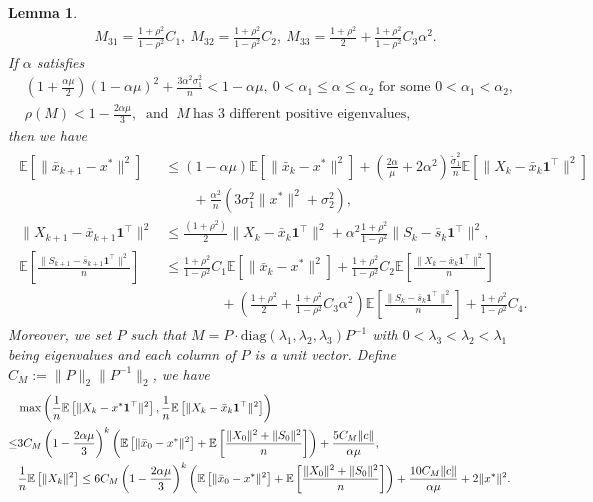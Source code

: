 \documentclass{article}
\theoremstyle{plain}
\newtheorem{lemma}[theorem]{Lemma}
\theoremstyle{definition}
\theoremstyle{remark}
\newcommand{\E}{\mathbb{E}}
\newcommand{\bfonet}{\mathbf{1}^{\top}}
\begin{document}
\begin{lemma}
\begin{align*}
        &M_{31} = \frac{1+\rho^2}{1-\rho^2}C_1,\ M_{32} = \frac{1+\rho^2}{1-\rho^2}C_2,\ M_{33} = \frac{1+\rho^2}{2} + \frac{1+\rho^2}{1-\rho^2}C_3\alpha^2.
    \end{align*}
    If $\alpha$ satisfies
    \begin{equation}\label{ineq: stepsize_for_quadratics}
        \begin{aligned}
            &\left(1+\frac{\alpha\mu}{2}\right)(1-\alpha\mu)^2 + \frac{3\alpha^2\sigma_1^2}{n}<1-\alpha\mu,\ 0< \alpha_1\leq \alpha \leq \alpha_2 \text{ for some } 0<\alpha_1<\alpha_2, \\
            &\rho(M) < 1 - \frac{2\alpha\mu}{3},\ \text{ and }~M~\text{has 3 different positive eigenvalues,}  
        \end{aligned}
    \end{equation} 
    then we have
    \begin{align}\label{ineq: dsgd_quadratic}
    \begin{aligned}
            \E\left[\|\bar{x}_{k+1} - x^*\|^2\right] &\leq (1-\alpha\mu)\E\left[\|\bar{x}_k - x^*\|^2\right] + \left(\frac{2\alpha}{\mu} + 2\alpha^2\right)\frac{\tilde{\sigma}_1^2}{n}\E\left[\|X_k - \bar{x}_k\bfonet\|^2\right]\\&\qquad + \frac{\alpha^2}{n}(3\sigma_1^2\|x^*\|^2 + \sigma_2^2), \\
        \|X_{k+1} - \bar{x}_{k+1}\bfonet\|^2 &\leq \frac{(1+\rho^2)}{2}\|X_k - \bar{x}_k\bfonet\|^2 + \alpha^2\frac{1+\rho^2}{1-\rho^2}\|S_k - \bar{s}_k\bfonet\|^2, \\
        \E\left[\frac{\|S_{k+1} - \bar{s}_{k+1}\bfonet\|^2}{n}\right] &\leq  \frac{1+\rho^2}{1-\rho^2}C_1\E\left[\|\bar{x}_k - x^*\|^2\right] + \frac{1+\rho^2}{1-\rho^2}C_2\E\left[\frac{\|X_k - \bar{x}_k\bfonet\|^2}{n}\right]  \\&\qquad \qquad + \left(\frac{1+\rho^2}{2}  + \frac{1+\rho^2}{1-\rho^2}C_3\alpha^2\right)\E\left[\frac{\|S_k-\bar{s}_k\bfonet\|^2}{n}\right] +\frac{1+\rho^2}{1-\rho^2}C_4.
        \end{aligned}
    \end{align}
    Moreover, we set $P$ such that $M = P\cdot\text{diag}(\lambda_1, \lambda_2, \lambda_3)P^{-1}$ with $0<\lambda_3<\lambda_2<\lambda_1$ being eigenvalues and each column of $P$ is a unit vector. Define $C_M:= \|P\|_2\|P^{-1}\|_2$, we have
    \begin{align}
        &\max\left(\frac{1}{n}\E\left[\|X_k - x^*\bfonet\|^2\right], \frac{1}{n}\E\left[\|X_k-\bar{x}_k\bfonet\|^2\right]\right) \notag \\
        \leq &3C_M\left(1-\frac{2\alpha\mu}{3}\right)^k\left(\E\left[\|\bar{x}_0 - x^*\|^2\right] + \E\left[\frac{\|X_0\|^2 + \|S_0\|^2}{n}\right]\right) + \frac{5C_M\|c\|}{\alpha\mu},   \label{ineq: quadratic_conv} \\
        &\frac{1}{n}\E\left[\|X_k\|^2\right]\leq 6C_M\left(1-\frac{2\alpha\mu}{3}\right)^k\left(\E\left[\|\bar{x}_0 - x^*\|^2\right] + \E\left[\frac{\|X_0\|^2 + \|S_0\|^2}{n}\right]\right) + \frac{10C_M\|c\|}{\alpha\mu} + 2\|x^*\|^2. \label{ineq: bdd_2_m}
    \end{align}
\end{lemma}
\end{document}
